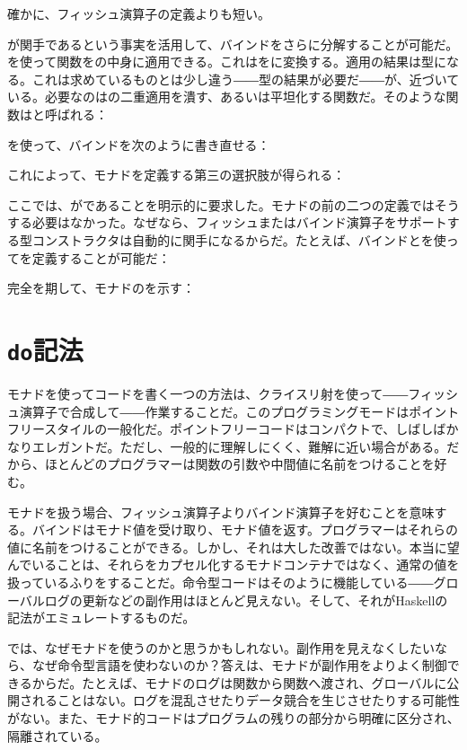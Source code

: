 確かに、フィッシュ演算子の定義よりも短い。

が関手であるという事実を活用して、バインドをさらに分解することが可能だ。を使って関数をの中身に適用できる。これはをに変換する。適用の結果は型になる。これは求めているものとは少し違う――型の結果が必要だ――が、近づいている。必要なのはの二重適用を潰す、あるいは平坦化する関数だ。そのような関数はと呼ばれる：

を使って、バインドを次のように書き直せる：

これによって、モナドを定義する第三の選択肢が得られる：

ここでは、がであることを明示的に要求した。モナドの前の二つの定義ではそうする必要はなかった。なぜなら、フィッシュまたはバインド演算子をサポートする型コンストラクタは自動的に関手になるからだ。たとえば、バインドとを使ってを定義することが可能だ：

完全を期して、モナドのを示す：


\section{\texttt{do}記法}

モナドを使ってコードを書く一つの方法は、クライスリ射を使って――フィッシュ演算子で合成して――作業することだ。このプログラミングモードはポイントフリースタイルの一般化だ。ポイントフリーコードはコンパクトで、しばしばかなりエレガントだ。ただし、一般的に理解しにくく、難解に近い場合がある。だから、ほとんどのプログラマーは関数の引数や中間値に名前をつけることを好む。

モナドを扱う場合、フィッシュ演算子よりバインド演算子を好むことを意味する。バインドはモナド値を受け取り、モナド値を返す。プログラマーはそれらの値に名前をつけることができる。しかし、それは大した改善ではない。本当に望んでいることは、それらをカプセル化するモナドコンテナではなく、通常の値を扱っているふりをすることだ。命令型コードはそのように機能している――グローバルログの更新などの副作用はほとんど見えない。そして、それがHaskellの記法がエミュレートするものだ。

では、なぜモナドを使うのかと思うかもしれない。副作用を見えなくしたいなら、なぜ命令型言語を使わないのか？答えは、モナドが副作用をよりよく制御できるからだ。たとえば、モナドのログは関数から関数へ渡され、グローバルに公開されることはない。ログを混乱させたりデータ競合を生じさせたりする可能性がない。また、モナド的コードはプログラムの残りの部分から明確に区分され、隔離されている。

